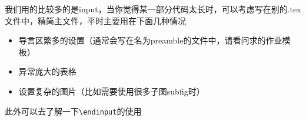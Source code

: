 	\begin{frame}[fragile]
		我们用的比较多的是input，当你觉得某一部分代码太长时，可以考虑写在别的.tex文件中，精简主文件，平时主要用在下面几种情况
		\begin{itemize}
			\item 导言区繁多的设置（通常会写在名为preamble的文件中，请看问求的作业模板）
			\item 异常庞大的表格
			\item 设置复杂的图片（比如需要使用很多子图subfig时）
		\end{itemize}
		此外可以去了解一下\verb|\endinput|的使用
	\end{frame}
